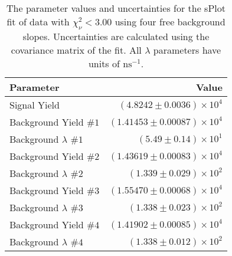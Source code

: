 
\begin{table}[ht]
    \begin{center}
        \begin{tabular}{lr}\toprule
            Parameter & Value \\\midrule
            Signal Yield & $(4.8242 \pm 0.0036) \times 10^{4}$ \\
            Background Yield $\#1$ & $(1.41453 \pm 0.00087) \times 10^{4}$ \\
            Background $\lambda$ $\#1$ & $(5.49 \pm 0.14) \times 10^{1}$ \\
            Background Yield $\#2$ & $(1.43619 \pm 0.00083) \times 10^{4}$ \\
            Background $\lambda$ $\#2$ & $(1.339 \pm 0.029) \times 10^{2}$ \\
            Background Yield $\#3$ & $(1.55470 \pm 0.00068) \times 10^{4}$ \\
            Background $\lambda$ $\#3$ & $(1.338 \pm 0.023) \times 10^{2}$ \\
            Background Yield $\#4$ & $(1.41902 \pm 0.00085) \times 10^{4}$ \\
            Background $\lambda$ $\#4$ & $(1.338 \pm 0.012) \times 10^{2}$ \\\bottomrule
        \end{tabular}
        \caption{The parameter values and uncertainties for the sPlot fit of data with $\chi^2_\nu < 3.00$ using four free background slopes. Uncertainties are calculated using the covariance matrix of the fit. All $\lambda$ parameters have units of $\si{\nano\second}^{-1}$.}\label{tab:splot-fit-results-chisqdof-3.00-free-4}
    \end{center}
\end{table}
